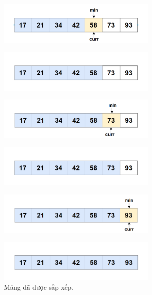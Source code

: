 \begin{itemize}
\begin{figure}[H]
    \centering
    \includegraphics[width=0.7\textwidth]{img/selection sort/10.png} 
\end{figure}

\begin{figure}[H]
    \centering
    \includegraphics[width=0.7\textwidth]{img/selection sort/11.png} 
\end{figure}

\begin{figure}[H]
    \centering
    \includegraphics[width=0.7\textwidth]{img/selection sort/12.png} 
\end{figure}

\begin{figure}[H]
    \centering
    \includegraphics[width=0.7\textwidth]{img/selection sort/13.png} 
\end{figure}

\begin{figure}[H]
    \centering
    \includegraphics[width=0.7\textwidth]{img/selection sort/14.png} 
\end{figure}

\begin{figure}[H]
    \centering
    \includegraphics[width=0.7\textwidth]{img/selection sort/15.png} 
    \caption{Mảng đã được sắp xếp.}
\end{figure}


\end{itemize}

